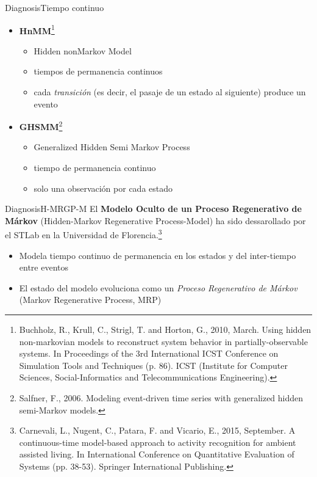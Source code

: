 \documentclass[9pt, handout]{beamer}
\begin{document}
      \begin{frame}{Diagnosis}{Tiempo continuo}
        \begin{itemize}
          \item \textbf{HnMM}\footnote{Buchholz, R., Krull, C., Strigl, T. and Horton, G., 2010, March. Using hidden non-markovian models to reconstruct system behavior in partially-observable systems. In Proceedings of the 3rd International ICST Conference on Simulation Tools and Techniques (p. 86). ICST (Institute for Computer Sciences, Social-Informatics and Telecommunications Engineering).}
          \begin{itemize}
            \item Hidden nonMarkov Model
            \item tiempos de permanencia continuos
            \item cada \textit{transición} (es decir, el pasaje de un estado al siguiente) produce un evento
          \end{itemize}
          \item \textbf{GHSMM}\footnote{Salfner, F., 2006. Modeling event-driven time series with generalized hidden semi-Markov models.}
          \begin{itemize}
            \item Generalized Hidden Semi Markov Process
            \item tiempo de permanencia continuo
            \item solo una observación por cada estado
          \end{itemize}
        \end{itemize}
      \end{frame}
      
      \begin{frame}{Diagnosis}{H-MRGP-M}
        El \textbf{Modelo Oculto de un Proceso Regenerativo de Márkov} (Hidden-Markov Regenerative Process-Model) ha sido dessarollado por el STLab en la Universidad de Florencia.\footnote{Carnevali, L., Nugent, C., Patara, F. and Vicario, E., 2015, September. A continuous-time model-based approach to activity recognition for ambient assisted living. In International Conference on Quantitative Evaluation of Systems (pp. 38-53). Springer International Publishing.}
        
        \begin{itemize}
          \item Modela tiempo continuo de permanencia en los estados y del inter-tiempo entre eventos
          \item El estado del modelo evoluciona como un \textit{Proceso Regenerativo de Márkov} (Markov Regenerative Process, MRP)
        \end{itemize}
      \end{frame}
      
\end{document}
